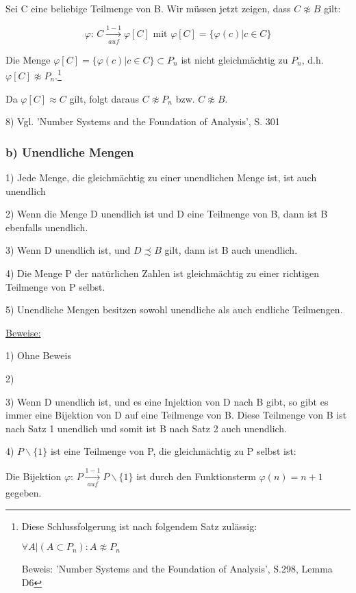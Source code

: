 \documentclass[12pt]{article}
\begin{document}
		Sei C eine beliebige Teilmenge von B.
		Wir müssen jetzt zeigen, dass $C \not \approx B$ gilt:
		
		\[\varphi\text{: } C \xrightarrow[auf]{1-1} \varphi[C] \text{ mit } \varphi[C] = \{\varphi(c) | c \in C\}\]
		
		Die Menge $\varphi[C] = \{\varphi(c) | c \in C\} \subset P_n$ ist nicht gleichmächtig
		zu $P_n$, d.h. $\varphi[C] \not \approx P_n$.\footnote{
			Diese Schlussfolgerung ist nach folgendem Satz zulässig:
			
			$\forall A | (A \subset P_n): A \not \approx P_n$
			
			Beweis: 'Number Systems and the Foundation of Analysis', S.298, Lemma D6
		}
		
		Da $\varphi[C] \approx C$ gilt, folgt daraus $C \not \approx P_n$ bzw. $C \not \approx B$.
		
		8) Vgl. 'Number Systems and the Foundation of Analysis', S. 301
		
		\subsubsection*{b) Unendliche Mengen}
		
		1) Jede Menge, die gleichmächtig zu einer unendlichen Menge ist, ist auch unendlich
		
		2) Wenn die Menge D unendlich ist und D eine Teilmenge von B, dann ist B ebenfalls \hspace*{4mm} unendlich.
		
		3) Wenn D unendlich ist, und $D \precsim B$ gilt, dann ist B auch unendlich.
		
		4) Die Menge P der natürlichen Zahlen ist gleichmächtig zu einer richtigen Teilmenge von P selbst.
		
		5) Unendliche Mengen besitzen sowohl unendliche als auch endliche Teilmengen.
		
		\underline{Beweise:}
		
		1) Ohne Beweis
		
		2) %
		
		3) Wenn D unendlich ist, und es eine Injektion von D nach B gibt, so gibt es immer eine Bijektion 
		von D auf eine Teilmenge von B.
		Diese Teilmenge von B ist nach Satz 1 unendlich und somit ist B nach Satz 2 auch unendlich.
		
		4) $P \backslash \{1\}$ ist eine Teilmenge von P, die gleichmächtig zu P selbst ist:
		
		Die Bijektion $\varphi$: $P \xrightarrow[auf]{1-1} P \backslash \{1\}$ ist durch den Funktionsterm
		$\varphi(n) = n + 1$ gegeben.
		
\end{document}
